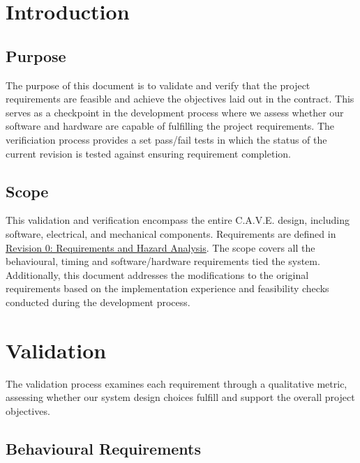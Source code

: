 \documentclass[11pt]{article}
\begin{document}
	\cleardoublepage
	\renewcommand{\thetable}{\arabic{table}}
	\setcounter{table}{0}
	
	\section{Introduction}
	\subsection{Purpose}
	
	The purpose of this document is to validate and verify that the project requirements are feasible and achieve the objectives laid out in the contract. This serves as a checkpoint in the development process where we assess whether our software and hardware are capable of fulfilling the project requirements. The verificiation process provides a set pass/fail tests in which the status of the current revision is tested against ensuring requirement completion.
	
	\subsection{Scope}
	This validation and verification encompass the entire C.A.V.E. design, including software, electrical, and mechanical components. Requirements are defined in \href{https://github.com/4tb6-cave/capstone/blob/main/docs/HazardAnalysis/HazardAnalysis.pdf}{Revision 0: Requirements and Hazard Analysis}. The scope covers all the behavioural, timing and software/hardware requirements tied the system. Additionally, this document addresses the modifications to the original requirements based on the implementation experience and feasibility checks conducted during the development process.
	
	\section{Validation} 
	
	The validation process examines each requirement through a qualitative metric, assessing whether our system design choices fulfill and support the overall project objectives.
	
	
	\subsection{Behavioural Requirements} 
	
\end{document}
